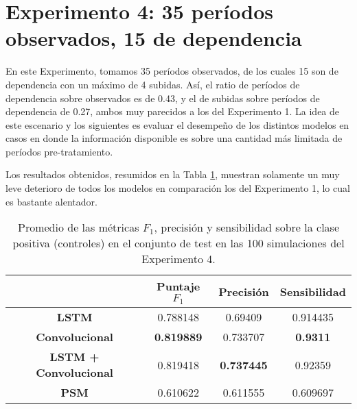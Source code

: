 \documentclass[../../main.tex]{subfiles}
\begin{document}
\section{Experimento 4: 35 períodos observados, 15 de dependencia}
En este Experimento, tomamos 35 períodos observados, de los cuales 15 son de dependencia
con un máximo de 4 subidas. Así, el ratio de períodos de dependencia sobre observados es
de 0.43, y el de subidas sobre períodos de dependencia de 0.27, ambos muy parecidos a los
del Experimento 1. La idea de este escenario y los siguientes es evaluar el desempeño de
los distintos modelos en casos en donde la información disponible es sobre una cantidad
más limitada de períodos pre-tratamiento.

Los resultados obtenidos, resumidos en la Tabla \ref{tab:results_exp4}, muestran solamente
un muy leve deterioro de todos los modelos en comparación los del Experimento 1, lo cual
es bastante alentador.

\begin{table}[H]
    \centering
    \renewcommand{\arraystretch}{1.2}
    \begin{tabular}{|c|c|c|c|}
        \hline
         & \textbf{Puntaje} \(F_1\) & \textbf{Precisión} & \textbf{Sensibilidad} \\ \hline\hline
        \textbf{LSTM}
            & 0.788148 & 0.69409 & 0.914435 \\ \hline
        \textbf{Convolucional}
            & \textbf{0.819889} & 0.733707 & \textbf{0.9311} \\ \hline
        \textbf{LSTM + Convolucional}
            & 0.819418 & \textbf{0.737445} & 0.92359 \\ \hline
        \textbf{PSM}
            & 0.610622 & 0.611555 & 0.609697 \\
        \hline
    \end{tabular}
    \caption{Promedio de las métricas \(F_1\), precisión y sensibilidad sobre la
    clase positiva (controles) en el conjunto de test en las 100 simulaciones del
    Experimento 4.}
    \label{tab:results_exp4}
\end{table}
\end{document}
